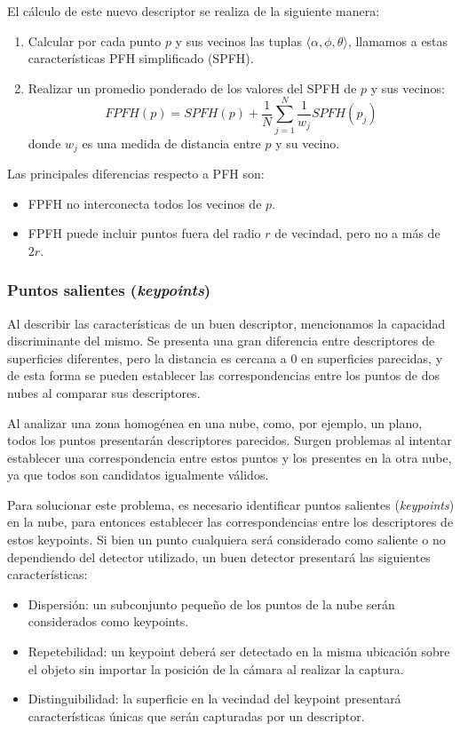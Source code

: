 El cálculo de este nuevo descriptor se realiza de la siguiente manera:
\begin{enumerate}
	\item Calcular por cada punto $p$ y sus vecinos las tuplas $\langle \alpha, \phi, \theta \rangle$,
		llamamos a estas características PFH simplificado (SPFH).
	\item Realizar un promedio ponderado de los valores del SPFH de $p$ y sus vecinos:
		\[
			FPFH(p) = SPFH(p) + \frac{1}{N} \sum_{j=1}^{N} \frac{1}{w_j} SPFH(p_j)
		\]
		donde $w_j$ es una medida de distancia entre $p$ y su vecino.
\end{enumerate}
Las principales diferencias respecto a PFH son:
\begin{itemize}
	\item FPFH no interconecta todos los vecinos de $p$.
	\item FPFH puede incluir puntos fuera del radio $r$ de vecindad, pero no a más de $2r$.
\end{itemize}


\subsubsection{Puntos salientes (\emph{keypoints})}
Al describir las características de un buen descriptor, mencionamos la capacidad discriminante del mismo.
Se presenta una gran diferencia entre descriptores de superficies diferentes,
pero la distancia es cercana a $0$ en superficies parecidas,
y de esta forma se pueden establecer las correspondencias entre los puntos de dos nubes
al comparar sus descriptores.

Al analizar una zona homogénea en una nube, como, por ejemplo, un plano,
todos los puntos presentarán descriptores parecidos.
Surgen problemas al intentar establecer una correspondencia entre estos puntos
y los presentes en la otra nube, ya que todos son candidatos igualmente válidos.

Para solucionar este problema, es necesario identificar puntos salientes (\emph{keypoints}) 
en la nube, para entonces establecer las correspondencias entre los descriptores de estos keypoints.
Si bien un punto cualquiera será considerado como saliente o no dependiendo del detector utilizado,
un buen detector presentará las siguientes características:
\begin{itemize}
	\item Dispersión: un subconjunto pequeño de los puntos de la nube serán considerados como keypoints.
	\item Repetebilidad: un keypoint deberá ser detectado en la misma ubicación
		sobre el objeto sin importar la posición de la cámara al realizar la captura.
	\item Distinguibilidad: la superficie en la vecindad del keypoint
		presentará características únicas que serán capturadas por un descriptor.
\end{itemize}

